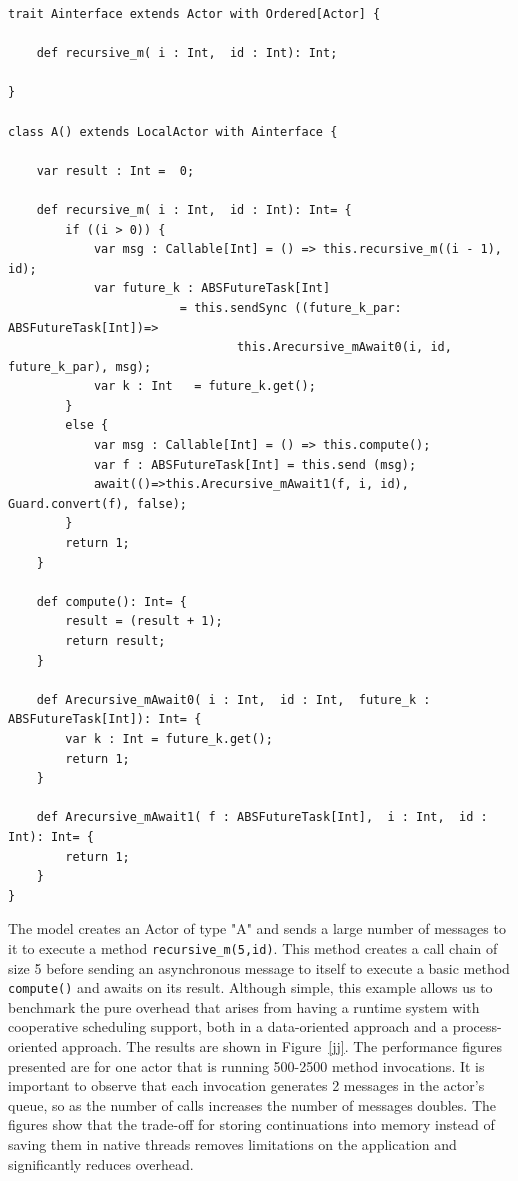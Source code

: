\begin{lstlisting}[caption= Benchmark Example, label=absex]
trait Ainterface extends Actor with Ordered[Actor] {

	def recursive_m( i : Int,  id : Int): Int;

}

class A() extends LocalActor with Ainterface {

	var result : Int =  0;
	
	def recursive_m( i : Int,  id : Int): Int= {
		if ((i > 0)) {
			var msg : Callable[Int] = () => this.recursive_m((i - 1), id);
			var future_k : ABSFutureTask[Int]  
						= this.sendSync ((future_k_par: ABSFutureTask[Int])=>
								this.Arecursive_mAwait0(i, id, future_k_par), msg);
			var k : Int   = future_k.get();
		}
		else {
			var msg : Callable[Int] = () => this.compute();
			var f : ABSFutureTask[Int] = this.send (msg);
			await(()=>this.Arecursive_mAwait1(f, i, id), Guard.convert(f), false);
		}
		return 1;
	}
	
	def compute(): Int= {
		result = (result + 1);
		return result;
	}
	
	def Arecursive_mAwait0( i : Int,  id : Int,  future_k : ABSFutureTask[Int]): Int= {
		var k : Int = future_k.get();
		return 1;
	}
	
	def Arecursive_mAwait1( f : ABSFutureTask[Int],  i : Int,  id : Int): Int= {
		return 1;
	}
}
\end{lstlisting}

\par The model creates an Actor of type "A" and sends a large number of messages to it to execute a method \lstinline|recursive_m(5,id)|. This method creates a call chain of size 5 before sending an asynchronous message to itself to execute a basic method \lstinline|compute()| and awaits on its result. Although simple, this example allows us to benchmark the pure overhead that arises from having a runtime system with cooperative scheduling support, both in a data-oriented approach and a process-oriented approach. The results are shown in Figure~\ref{jj}. The performance figures presented are for one actor that is running 500-2500 method invocations. It is important to observe that each invocation generates 2 messages in the actor’s queue, so as the number of calls increases the number of messages doubles. The figures show that the trade-off for storing continuations into memory instead of saving them in native threads removes limitations on the application and significantly reduces overhead. 

